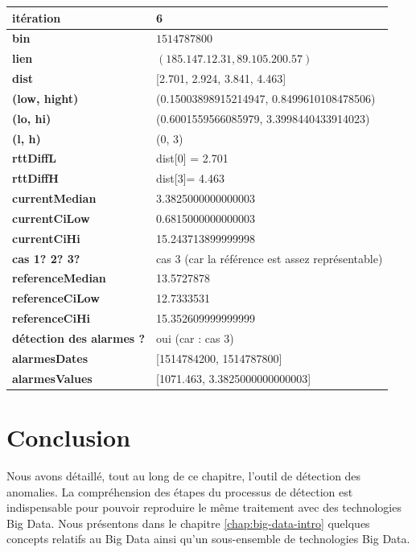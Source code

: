 \begin{table}[H]
	\centering
	
	\begin{tabularx}{\linewidth}{|l|X| }
		\hline
		\textbf{itération} & 6	\\ \hline
		\textbf{bin} & $1514787800$ \\ \hline
		\textbf{lien} & $(185.147.12.31, 89.105.200.57)$  \\ \hline
		\textbf{dist}& [2.701, 2.924, 3.841, 4.463]	\\ \hline
		\textbf{(low, hight)}& (0.15003898915214947, 0.8499610108478506) 	\\ \hline
		\textbf{(lo, hi)}&(0.6001559566085979, 3.3998440433914023)  \\ \hline
		\textbf{(l, h)} & (0, 3) 	\\ \hline
		\textbf{rttDiffL}& dist[0] = 2.701	\\ \hline
		\textbf{rttDiffH}& dist[3]= 4.463	\\ \hline
		\textbf{currentMedian}&  3.3825000000000003	\\ \hline
		\textbf{currentCiLow}& 0.6815000000000003 	\\ \hline
		\textbf{currentCiHi}& 15.243713899999998	\\ \hline
		\textbf{cas 1? 2? 3?}& cas 3 (car la référence est assez représentable)  \\ \hline
		\textbf{referenceMedian}& 13.5727878 	\\ \hline
		\textbf{referenceCiLow}&  12.7333531	\\ \hline
		\textbf{referenceCiHi}& 15.352609999999999 	\\ \hline
		\textbf{détection des alarmes ?}& oui (car : cas 3)	\\ \hline
		\textbf{alarmesDates}& [1514784200, 1514787800]	\\ \hline
		\textbf{alarmesValues}& [1071.463, 3.3825000000000003]	\\ \hline
	\end{tabularx}
\end{table}

\section{Conclusion}

Nous avons détaillé, tout au long de ce chapitre, l'outil de détection des anomalies. La compréhension des étapes du processus de détection est indispensable pour pouvoir reproduire le même traitement avec des technologies Big Data. Nous présentons dans le chapitre \ref{chap:big-data-intro}   quelques concepts relatifs au Big Data ainsi qu'un sous-ensemble de technologies Big Data.